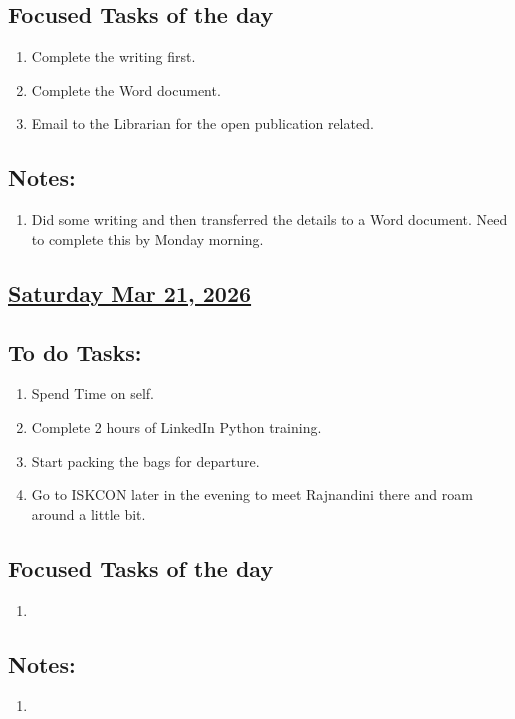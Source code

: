 \subsection*{Focused Tasks of the day}
\begin{enumerate}[\ding{212}]  
    \item Complete the writing first. \xmark
    \item Complete the Word document. \cmark
    \item Email to the Librarian for the open publication related. \xmark
\end{enumerate}
\subsection*{Notes:}
\begin{enumerate}
    \item Did some writing and then transferred the details to a Word document. Need to complete this by Monday morning.
\end{enumerate}
\subsection*{\underline{Saturday Mar 21, 2026} }
\subsection*{To do Tasks:}
\begin{enumerate}
    \item Spend Time on self.
    \item Complete 2 hours of LinkedIn Python training.
    \item Start packing the bags for departure.
    \item Go to ISKCON later in the evening to meet Rajnandini there and roam around a little bit. 
\end{enumerate}
\subsection*{Focused Tasks of the day}
\begin{enumerate}[\ding{212}]  
    \item 
\end{enumerate}
\subsection*{Notes:}
\begin{enumerate}
    \item 
\end{enumerate}
\stardivider
